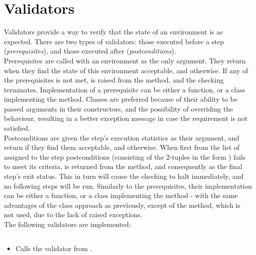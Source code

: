 \section{Validators}\label{sec:validators}

    Validators provide a way to verify that the state of an environment is as expected.
    There are two types of validators: those executed before a step (\textit{prerequisites}), and those executed after
    (\textit{postconditions}). \\

     \label{sec:prerequisites_desc} Prerequisites are called with an environment as the only argument.
    They return  when they find the state of this environment acceptable, and  otherwise.
    If any of the prerequisites is not met,  is raised from the
     method, and the checking terminates.
    Implementation of a prerequisite can be either a function, or a class implementing the  method.
    Classes are preferred because of their ability to be passed arguments in their constructors, and the possibility of
    overriding the  behaviour, resulting in a better exception message in case the requirement is not
    satisfied.\\

     \label{sec:postconditions_desc} Postconditions are given the step's execution statistics as their
    argument, and return  if they find them acceptable, and  otherwise.
    When first from the list of assigned to the step postconditions (consisting of the 2-tuples in the form
    ) fails to meet its criteria,  is returned from the
     method, and consequently as the final step's
    exit status.
    This in turn will cause the checking to halt immediately, and no following steps will be run.
    Similarly to the prerequisites, their implementation can be either a function, or a class implementing the
     method - with the same advantages of the class approach as previously, except of the
     method, which is not used, due to the lack of raised exceptions.\\

    The following validators are implemented:

\subsection*{}\label{subsec:FileExistsPrerequisite}
\begin{itemize}[label={}]
    \item Calls the  validator from
          \hyperref[sec:Validators]{}.
\end{itemize}

